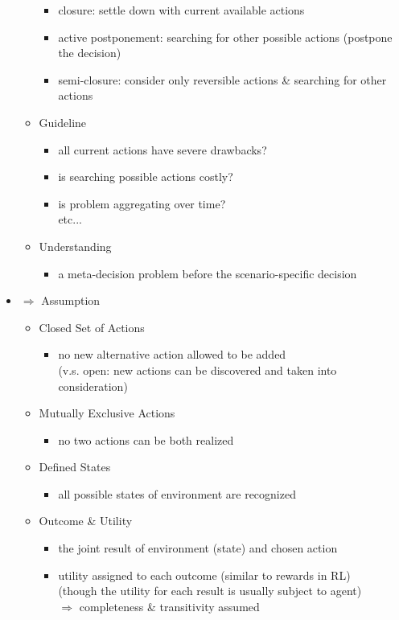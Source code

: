 \begin{itemize}
\begin{itemize}
		\begin{itemize}
		\item closure: settle down with current available actions
		\item active postponement: searching for other possible actions (postpone the decision)
		\item semi-closure: consider only reversible actions \& searching for other actions
		\end{itemize}
	\item Guideline
		\begin{itemize}
		\item all current actions have severe drawbacks?
		\item is searching possible actions costly?
		\item is problem aggregating over time? \\
		etc...
		\end{itemize}
	\item Understanding
		\begin{itemize}
		\item a meta-decision problem before the scenario-specific decision
		\end{itemize}
	\end{itemize}
\item $\Rightarrow$ Assumption
	\begin{itemize}
	\item Closed Set of Actions
		\begin{itemize}
		\item no new alternative action allowed to be added \\
		(v.s. open: new actions can be discovered and taken into consideration)
		\end{itemize}
	\item Mutually Exclusive Actions
		\begin{itemize}
		\item no two actions can be both realized
		\end{itemize}
	\item Defined States
		\begin{itemize}
		\item all possible states of environment are recognized
		\end{itemize}
	\item Outcome \& Utility
		\begin{itemize}
		\item the joint result of environment (state) and chosen action
		\item utility assigned to each outcome (similar to rewards in RL) \\
		(though the utility for each result is usually subject to agent) \\
		$\Rightarrow$ completeness \& transitivity assumed		
		\end{itemize}
	\end{itemize}
\end{itemize}
